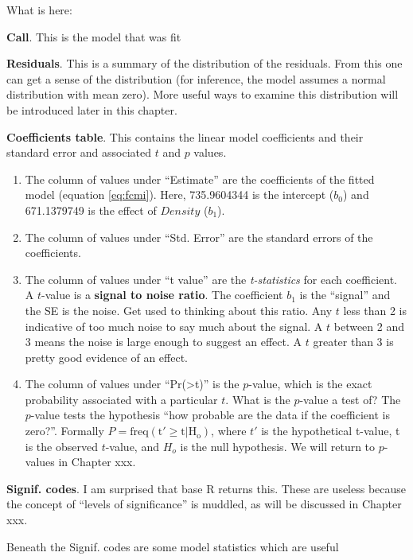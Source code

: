 \documentclass[]{book}
\providecommand{\tightlist}{%
  \setlength{\itemsep}{0pt}\setlength{\parskip}{0pt}}
\theoremstyle{definition}
\theoremstyle{definition}
\theoremstyle{definition}
\theoremstyle{remark}
\begin{document}
What is here:

\textbf{Call}. This is the model that was fit

\textbf{Residuals}. This is a summary of the distribution of the
residuals. From this one can get a sense of the distribution (for
inference, the model assumes a normal distribution with mean zero). More
useful ways to examine this distribution will be introduced later in
this chapter.

\textbf{Coefficients table}. This contains the linear model coefficients
and their standard error and associated \(t\) and \(p\) values.

\begin{enumerate}
\def\labelenumi{\arabic{enumi}.}
\tightlist
\item
  The column of values under ``Estimate'' are the coefficients of the
  fitted model (equation \eqref{eq:fcmi}). Here, 735.9604344 is the
  intercept (\(b_0\)) and 671.1379749 is the effect of \(Density\)
  (\(b_1\)).
\item
  The column of values under ``Std. Error'' are the standard errors of
  the coefficients.
\item
  The column of values under ``t value'' are the \emph{t-statistics} for
  each coefficient. A \(t\)-value is a \textbf{signal to noise ratio}.
  The coefficient \(b_1\) is the ``signal'' and the SE is the noise. Get
  used to thinking about this ratio. Any \(t\) less than 2 is indicative
  of too much noise to say much about the signal. A \(t\) between 2 and
  3 means the noise is large enough to suggest an effect. A \(t\)
  greater than 3 is pretty good evidence of an effect.
\item
  The column of values under ``Pr(\textgreater{}\textbar{}t\textbar{})''
  is the \(p\)-value, which is the exact probability associated with a
  particular \(t\). What is the \(p\)-value a test of? The \(p\)-value
  tests the hypothesis ``how probable are the data if the coefficient is
  zero?''. Formally \(P = \mathrm{freq(t' \ge t|H_o)}\), where \(t'\) is
  the hypothetical t-value, t is the observed \(t\)-value, and \(H_o\)
  is the null hypothesis. We will return to \(p\)-values in Chapter xxx.
\end{enumerate}

\textbf{Signif. codes}. I am surprised that base R returns this. These
are useless because the concept of ``levels of significance'' is
muddled, as will be discussed in Chapter xxx.

Beneath the Signif. codes are some model statistics which are useful
\end{document}
